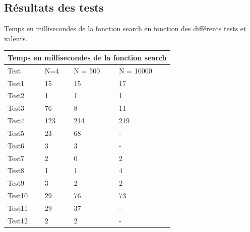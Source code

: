 \documentclass[utf8]{article}
\begin{document}
\begin{large}
  \subsection{Résultats des tests}
  \par
  \indent
  Temps en millisecondes de la fonction search en fonction des différents tests et valeurs.

  \begin{tabular}{ |p{3cm}||p{3cm}|p{3cm}|p{3cm}|  }
    \hline
    \multicolumn{4}{|c|}{Temps en millisecondes de la fonction search} \\
    \hline
    Test   & N=4 & N = 500 & N = 10000                                 \\
    \hline
    Test1  & 15  & 15      & 17                                        \\
    Test2  & 1   & 1       & 1                                         \\
    Test3  & 76  & 8       & 11                                        \\
    Test4  & 123 & 214     & 219                                       \\
    Test5  & 23  & 68      & -                                         \\
    Test6  & 3   & 3       & -                                         \\
    Test7  & 2   & 0       & 2                                         \\
    Test8  & 1   & 1       & 4                                         \\
    Test9  & 3   & 2       & 2                                         \\
    Test10 & 29  & 76      & 73                                        \\
    Test11 & 29  & 37      & -                                         \\
    Test12 & 2   & 2       & -                                         \\
    \hline
  \end{tabular}


\end{large}
\end{document}

